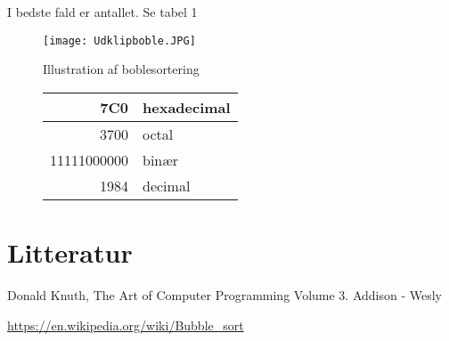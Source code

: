\documentclass{article}
\begin{document}
I bedste fald er antallet. Se tabel 1



\begin{figure}[H]
    \centering
     \label{fig:my_label}
\texttt{[image: Udklipboble.JPG]}
\caption{Illustration af boblesortering}
\end{figure}


\begin{figure}[H]
\centering
\begin{tabular}{|r|l|}
\hline
7C0 & hexadecimal\\
\hline
3700 & octal\\
\hline
11111000000 & binær\\
\hline
1984 & decimal\\
\hline

\end{tabular}    
\end{figure}



\section{Litteratur}


\begin{thebibliography}{1}

Donald Knuth,
The Art of Computer Programming
Volume 3. Addison - Wesly



\url{https://en.wikipedia.org/wiki/Bubble_sort}

\end{thebibliography}
\end{document}
